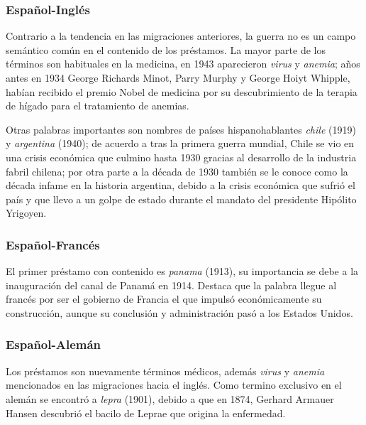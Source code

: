 \subsubsection*{Español-Inglés}%

Contrario a la tendencia en las migraciones anteriores, la guerra no es un campo semántico común en el contenido de los préstamos. La mayor parte de los términos son habituales en la medicina,  en 1943  aparecieron  \textit{virus} y \textit{anemia};  años antes en 1934 George Richards Minot, Parry Murphy y George Hoiyt Whipple, habían recibido el premio Nobel de medicina por su descubrimiento de la terapia de hígado para el tratamiento de anemias.   

Otras palabras importantes son nombres de países hispanohablantes \textit{chile} (1919) y \textit{argentina} (1940); de acuerdo a \cite{crisis_chile} tras la primera guerra mundial, Chile se vio en una crisis económica  que culmino hasta 1930 gracias al desarrollo de la industria fabril chilena; por otra parte a la década de 1930 también se le conoce como la década infame en la historia argentina, debido a la crisis económica que sufrió el país  y que llevo a un golpe de estado durante el mandato del presidente Hipólito Yrigoyen. 

\subsubsection*{Español-Francés}%

El primer préstamo con contenido es \textit{panama} (1913), su importancia se debe a la inauguración del canal de Panamá en 1914. Destaca que la palabra llegue al francés por ser el gobierno de Francia el que impulsó económicamente su construcción, aunque su conclusión y administración pasó a los Estados Unidos.  




\subsubsection*{Español-Alemán}


Los préstamos son nuevamente términos médicos, además \textit{virus} y \textit{anemia} mencionados en las migraciones hacia el inglés. Como termino exclusivo en el alemán  se encontró a \textit{lepra} (1901), debido a que en 1874, Gerhard Armauer Hansen descubrió el bacilo de Leprae que origina la enfermedad.



